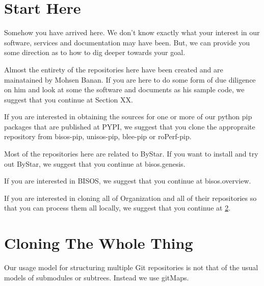 \section{Start Here}

Somehow you have arrived here. We don't know exactly what your
interest in our software, services and documentation may have been.
But, we can provide you some direction as to how to dig deeper towards
your goal.

Almost the entirety of the repositories here have been created and are
mainatained by Mohsen Banan. If you are here to do some form of due
diligence on him and look at some the software and documents as his
sample code, we suggest that you continue at Section XX.

If you are interested in obtaining the sources for one or more of our
python pip packages that are published at PYPI, we suggest that you
clone the appropraite repository from bisos-pip, unisos-pip, blee-pip
or roPerf-pip.

Most of the repositories here are related to ByStar. If you want to
install and try out ByStar, we suggest that you continue at bisos.genesis.

If you are interested in BISOS, we suggest that you continue at bisos.overview.

If you are interested in cloning all of Organization and all of their
repositories so that you can process them all locally, we suggest that you continue at
\ref{sec:CloningTheWholeThing}.


\begin{comment}
*  [[elisp:(org-cycle)][| ]] [[elisp:(org-show-subtree)][|=]] [[elisp:(show-children 10)][|V]] [[elisp:(bx:orgm:indirectBufOther)][|>]] [[elisp:(bx:orgm:indirectBufMain)][|I]] [[elisp:(blee:ppmm:org-mode-toggle)][|N]] [[elisp:(org-top-overview)][|O]] [[elisp:(progn (org-shifttab) (org-content))][|C]] [[elisp:(delete-other-windows)][|1]]  /Section/   Cloning The Whole Thing ::  [[elisp:(org-cycle)][| ]]
\end{comment}

\section{Cloning The Whole Thing}
\label{sec:CloningTheWholeThing}

Our usage model for structuring multiple Git repositories is not that
of the usual models of submodules or subtrees. Instead we use gitMaps.

